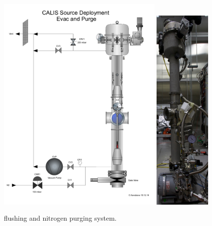 \begin{figure}[htbp]
 \centering
  \includegraphics[width=0.73\textwidth]{Figures/GasSystem.png}
  \includegraphics[width=0.25\textwidth]{Figures/CALIS_overview_IMG_3763.JPG}
  \caption{flushing and nitrogen purging system.}
  \label{fig:flushing_purging}
\end{figure}


